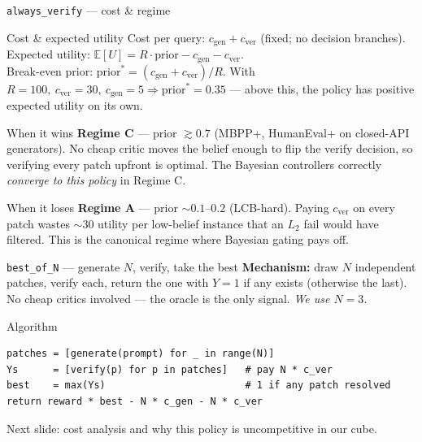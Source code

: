 \documentclass[10pt]{beamer}
\newcommand{\good}[1]{\textcolor{accentGreen}{\textbf{#1}}}
\newcommand{\bad}[1]{\textcolor{accentRed}{\textbf{#1}}}
\newcommand{\info}[1]{\textcolor{primaryBlue}{\textbf{#1}}}
\begin{document}
\begin{frame}[fragile]{\texttt{always\_verify} --- cost \& regime}
\begin{block}{Cost \& expected utility}
\footnotesize
Cost per query: $c_\text{gen} + c_\text{ver}$ (fixed; no decision branches). \\[2pt]
Expected utility: $\mathbb{E}[U] = R \cdot \text{prior} - c_\text{gen} - c_\text{ver}$.\\[2pt]
Break-even prior: $\text{prior}^{*} = (c_\text{gen}+c_\text{ver})/R$. With
$R=100,\ c_\text{ver}=30,\ c_\text{gen}=5 \Rightarrow \text{prior}^{*} = 0.35$ ---
above this, the policy has positive expected utility on its own.
\end{block}

\begin{exampleblock}{When it wins}
\good{Regime C} --- prior $\gtrsim 0.7$ (MBPP+, HumanEval+ on closed-API
generators). No cheap critic moves the belief enough to flip the verify
decision, so verifying every patch upfront is optimal. The Bayesian
controllers correctly \emph{converge to this policy} in Regime C.
\end{exampleblock}

\begin{alertblock}{When it loses}
\bad{Regime A} --- prior $\sim 0.1$--$0.2$ (LCB-hard). Paying $c_\text{ver}$
on every patch wastes $\sim 30$ utility per low-belief instance that an
$L_2$ fail would have filtered. This is the canonical regime where
Bayesian gating pays off.
\end{alertblock}
\end{frame}

\begin{frame}[fragile]{\texttt{best\_of\_N} --- generate $N$, verify, take the best}
\info{Mechanism:} draw $N$ independent patches, verify each, return the one
with $Y{=}1$ if any exists (otherwise the last). No cheap critics involved
--- the oracle is the only signal. \emph{We use $N=3$.}

\begin{block}{Algorithm}
\begin{lstlisting}
patches = [generate(prompt) for _ in range(N)]
Ys      = [verify(p) for p in patches]   # pay N * c_ver
best    = max(Ys)                        # 1 if any patch resolved
return reward * best - N * c_gen - N * c_ver
\end{lstlisting}
\end{block}

\textcolor{softGrey}{\scriptsize Next slide: cost analysis and why this
policy is uncompetitive in our cube.}
\end{frame}
\end{document}
